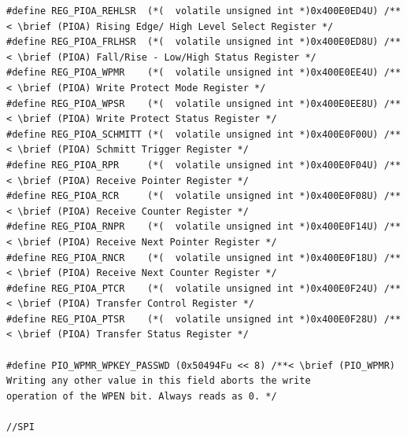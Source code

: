 \documentclass[12pt]{article}
\begin{document}
\begin{tiny}
\begin{verbatim}
#define REG_PIOA_REHLSR  (*(  volatile unsigned int *)0x400E0ED4U) /**< \brief (PIOA) Rising Edge/ High Level Select Register */
#define REG_PIOA_FRLHSR  (*(  volatile unsigned int *)0x400E0ED8U) /**< \brief (PIOA) Fall/Rise - Low/High Status Register */
#define REG_PIOA_WPMR    (*(  volatile unsigned int *)0x400E0EE4U) /**< \brief (PIOA) Write Protect Mode Register */
#define REG_PIOA_WPSR    (*(  volatile unsigned int *)0x400E0EE8U) /**< \brief (PIOA) Write Protect Status Register */
#define REG_PIOA_SCHMITT (*(  volatile unsigned int *)0x400E0F00U) /**< \brief (PIOA) Schmitt Trigger Register */
#define REG_PIOA_RPR     (*(  volatile unsigned int *)0x400E0F04U) /**< \brief (PIOA) Receive Pointer Register */
#define REG_PIOA_RCR     (*(  volatile unsigned int *)0x400E0F08U) /**< \brief (PIOA) Receive Counter Register */
#define REG_PIOA_RNPR    (*(  volatile unsigned int *)0x400E0F14U) /**< \brief (PIOA) Receive Next Pointer Register */
#define REG_PIOA_RNCR    (*(  volatile unsigned int *)0x400E0F18U) /**< \brief (PIOA) Receive Next Counter Register */
#define REG_PIOA_PTCR    (*(  volatile unsigned int *)0x400E0F24U) /**< \brief (PIOA) Transfer Control Register */
#define REG_PIOA_PTSR    (*(  volatile unsigned int *)0x400E0F28U) /**< \brief (PIOA) Transfer Status Register */

#define PIO_WPMR_WPKEY_PASSWD (0x50494Fu << 8) /**< \brief (PIO_WPMR) Writing any other value in this field aborts the write
operation of the WPEN bit. Always reads as 0. */

//SPI


\end{verbatim}
\end{tiny}
\end{document}

